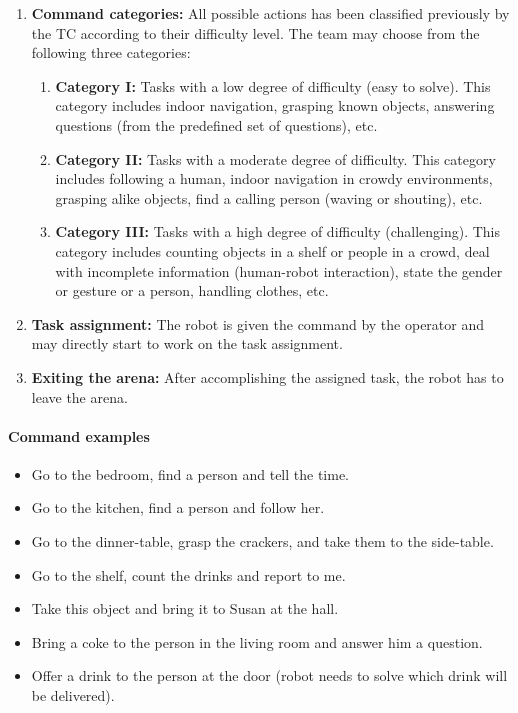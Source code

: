 \begin{enumerate}
	\item \textbf{Command categories:} All possible actions has been classified previously by the TC according to their difficulty level. The team may choose from the following three categories:
	\begin{enumerate}
		\item \textbf{Category I:} Tasks with a low degree of difficulty (easy to solve). This category includes indoor navigation, grasping known objects, answering questions (from the predefined set of questions), etc.
		\item \textbf{Category II:} Tasks with a moderate degree of difficulty. This category includes following a human, indoor navigation in crowdy environments, grasping alike objects, find a calling person (waving or shouting), etc.
		\item \textbf{Category III:} Tasks with a high degree of difficulty (challenging). This category includes counting objects in a shelf or people in a crowd, deal with incomplete information (human-robot interaction), state the gender or gesture or a person, handling clothes, etc.
	\end{enumerate}

	\item \textbf{Task assignment:} The robot is given the command by the operator and may directly start to work on the task assignment.
	\item \textbf{Exiting the arena:} After accomplishing the assigned task, the robot has to leave the arena.
\end{enumerate}

\paragraph{Command examples}
\begin{itemize}
\item Go to the bedroom, find a person and tell the time.
\item Go to the kitchen, find a person and follow her.
\item Go to the dinner-table, grasp the crackers, and take them to the side-table.
\item Go to the shelf, count the drinks and report to me.
\item Take this object and bring it to Susan at the hall.
\item Bring a coke to the person in the living room and answer him a question.
\item Offer a drink to the person at the door (robot needs to solve which drink will be delivered).
\end{itemize}


